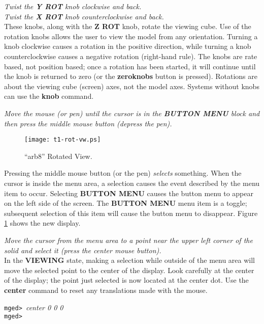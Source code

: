 \noindent
{\em Twist the {\bf Y ROT} knob clockwise and back.}\\
{\em Twist the {\bf X ROT} knob counterclockwise and back.}\\

These knobs, along with the {\bf Z ROT} knob, rotate the viewing cube.
Use of the rotation
knobs allows the user to view the model from any orientation.
Turning a knob clockwise causes a rotation in the positive direction,
while turning a knob counterclockwise causes a negative rotation
(right-hand rule).  The knobs are rate based, not position based;
once a rotation has been started, it will continue until the
knob is returned to zero (or the {\bf zeroknobs} button is pressed).
Rotations are about the viewing cube (screen) axes, not the model axes.
Systems without knobs can use the {\bf knob} command.

\noindent
{\em Move the mouse (or pen) until the cursor is in the {\bf BUTTON MENU}
block and then press the middle mouse button (depress the pen).}\\

\begin{figure}
\centering \texttt{[image: t1-rot-vw.ps]}
\caption{``arb8'' Rotated View.}
\label{t1-rot-vw}
\end{figure}

Pressing the middle mouse button (or the pen) {\sl selects} something.
When the cursor is inside the menu area, a selection
causes the event described by the menu item to occur.
Selecting {\bf BUTTON MENU} causes the button menu to appear on the left
side of the screen. The {\bf BUTTON MENU} menu item is
a toggle; subsequent selection of this item will cause the button menu
to disappear.
Figure \ref{t1-rot-vw} shows the new display.

\noindent
{\em Move the cursor from the menu area to a point near the
upper left corner of the solid and select it (press the center mouse
button).}\\

In the {\bf VIEWING} state, making a selection while outside of the menu
area will move the selected point to the center of the display.  Look
carefully at the center of the display; the point just selected is now
located at the center dot. Use the {\bf center} command to reset any
translations made with the mouse.

\noindent
{\tt mged> }{\em center 0 0 0}\\
{\tt mged> }\\

